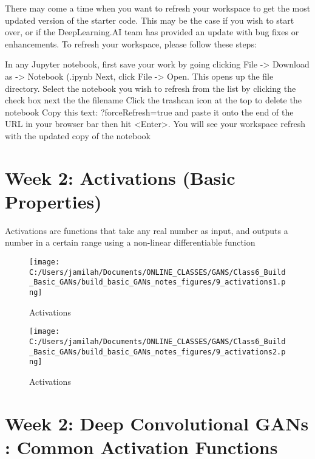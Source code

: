 \documentclass[11pt, onecolumn]{article}
\begin{document}
There may come a time when you want to refresh your workspace to get the most updated version of the starter code.  This may be the case if you wish to start over, or if the DeepLearning.AI team has provided an update with bug fixes or enhancements.  To refresh your workspace, please follow these steps:

In any Jupyter notebook, first save your work by going clicking File -> Download as -> Notebook (.ipynb
Next, click File -> Open. This opens up the file directory.
Select the notebook you wish to refresh from the list by clicking the check box next the the filename
Click the trashcan icon at the top to delete the notebook
Copy this text: ?forceRefresh=true and paste it onto the end of the URL in your browser bar then hit <Enter>.
You will see your workspace refresh with the updated copy of the notebook


\clearpage
\section{Week 2: Activations (Basic Properties)}

Activations are functions that take any real number as input, and outputs a number in a certain range using a non-linear differentiable function

\begin{figure}[htp]
\begin{center}
\texttt{[image: C:/Users/jamilah/Documents/ONLINE\_CLASSES/GANS/Class6\_Build\_Basic\_GANs/build\_basic\_GANs\_notes\_figures/9\_activations1.png]}
\end{center}
\caption{Activations}
\label{9_activations1}
\end{figure}

\begin{figure}[htp]
\begin{center}
\texttt{[image: C:/Users/jamilah/Documents/ONLINE\_CLASSES/GANS/Class6\_Build\_Basic\_GANs/build\_basic\_GANs\_notes\_figures/9\_activations2.png]}
\end{center}
\caption{Activations}
\label{9_activations2}
\end{figure}

\section{Week 2: Deep Convolutional GANs : Common Activation Functions}
\end{document}
